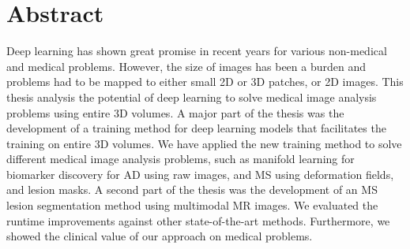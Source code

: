 \chapter*{Abstract}

Deep learning has shown great promise in recent years for various non-medical
and medical problems. However, the size of images has been a burden and problems
had to be mapped to either small 2D or 3D patches, or 2D images. This thesis
analysis the potential of deep learning to solve medical image analysis problems
using entire 3D volumes. A major part of the thesis was the development of a
training method for deep learning models that facilitates the training on entire
3D volumes. We have applied the new training method to solve different medical
image analysis problems, such as manifold learning for biomarker discovery for
AD using raw images, and MS using deformation fields, and lesion masks. A second
part of the thesis was the development of an MS lesion segmentation method using
multimodal MR images. We evaluated the runtime improvements against other
state-of-the-art methods. Furthermore, we showed the clinical value of our
approach on medical problems.
